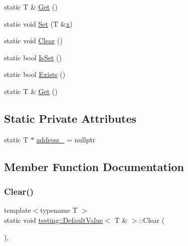 \begin{DoxyCompactItemize}
\item 
static T \& \mbox{\hyperlink{classtesting_1_1_default_value_3_01_t_01_6_01_4_a1310448dd8c171aecfcbf7c8df5de7bd}{Get}} ()
\item 
static void \mbox{\hyperlink{classtesting_1_1_default_value_3_01_t_01_6_01_4_a9863abf3d311ce5007d7e57dfce2f252}{Set}} (T \&\mbox{\hyperlink{_obj__test_2lib_2googletest-master_2googlemock_2test_2gmock-matchers__test_8cc_a6150e0515f7202e2fb518f7206ed97dc}{x}})
\item 
static void \mbox{\hyperlink{classtesting_1_1_default_value_3_01_t_01_6_01_4_a3c8f9f81e591370f9b33798f58ca1a10}{Clear}} ()
\item 
static bool \mbox{\hyperlink{classtesting_1_1_default_value_3_01_t_01_6_01_4_a3e61547c2f0141cc8004385f3a9c817d}{Is\+Set}} ()
\item 
static bool \mbox{\hyperlink{classtesting_1_1_default_value_3_01_t_01_6_01_4_a38420499e17d2fb4146ae6c4265f0d55}{Exists}} ()
\item 
static T \& \mbox{\hyperlink{classtesting_1_1_default_value_3_01_t_01_6_01_4_a1310448dd8c171aecfcbf7c8df5de7bd}{Get}} ()
\end{DoxyCompactItemize}
\subsection*{Static Private Attributes}
\begin{DoxyCompactItemize}
\item 
static T $\ast$ \mbox{\hyperlink{classtesting_1_1_default_value_3_01_t_01_6_01_4_a49d846b827b1a35b60e2eaad98de5c04}{address\+\_\+}} = nullptr
\end{DoxyCompactItemize}


\subsection{Member Function Documentation}
\mbox{\label{classtesting_1_1_default_value_3_01_t_01_6_01_4_a3c8f9f81e591370f9b33798f58ca1a10}} 
\subsubsection{\texorpdfstring{Clear()}{Clear()}\hspace{0.1cm}{\footnotesize\ttfamily [1/3]}}
{\footnotesize\ttfamily template$<$typename T $>$ \\
static void \mbox{\hyperlink{classtesting_1_1_default_value}{testing\+::\+Default\+Value}}$<$ T \& $>$\+::Clear (\begin{DoxyParamCaption}{ }\end{DoxyParamCaption})\hspace{0.3cm}{\ttfamily [inline]}, {\ttfamily [static]}}

